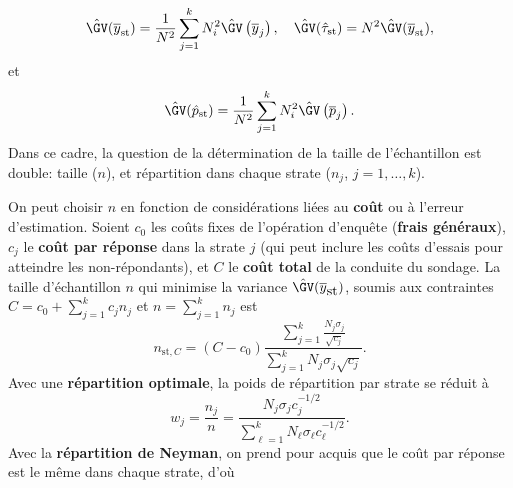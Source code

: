 $$\hat{\GV}(\overline{y}_{\textrm{st}})=\frac{1}{N^2}\sum_{j=1}^kN_i^2\hat{\GV}\left(\overline{y}_j\right),\quad \hat{\GV}(\hat{\tau}_{\textrm{st}})=N^2\hat{\GV}(\overline{y}_{\textrm{st}}),$$ et $$\hat{\GV}(\hat{p}_{\textrm{st}})=\frac{1}{N^2}\sum_{j=1}^kN_i^2\hat{\GV}\left(\overline{p}_j\right).$$ Dans ce cadre, la question de la détermination de la taille de l'échantillon est double: taille ($n$), et répartition dans chaque strate ($n_j$, $j=1,\ldots,k$). \par On peut choisir $n$ en fonction de considérations li\'ees au \textbf{coût} ou \`a l'erreur d'estimation. Soient $c_0$ les coûts fixes de l'opération d'enquête (\textbf{frais généraux}), $c_j$ le \textbf{coût par réponse} dans la strate $j$ (qui peut inclure les coûts d'essais pour atteindre les non-répondants), et $C$ le \textbf{coût total} de la conduite du sondage. La taille d'échantillon $n$ qui minimise la variance  $\hat{\GV}(\overline{y}_{\mbox{st}})$,  soumis aux contraintes $C=c_0+\sum_{j=1}^kc_jn_j$ et  $n=\sum_{j=1}^kn_j$ est  $$n_{\textrm{st},C}=(C-c_0)\frac{\sum_{j=1}^k \frac{N_j\sigma_j}{\sqrt{c_j}}}{\sum_{j=1}^k N_j\sigma_j\sqrt{c_j}}.$$ Avec une  \textbf{r\'epartition optimale}, la poids de r\'epartition par strate se r\'eduit \`a   $$w_j=\frac{n_j}{n}=\frac{N_j\sigma_jc_{j}^{-1/2}}{\sum_{\ell=1}^kN_{\ell}\sigma_{\ell}c_{\ell}^{-1/2}}.$$ 
Avec la \textbf{r\'epartition de Neyman}, on prend pour acquis que le co\^ut par r\'eponse est le m\^eme dans chaque strate, d'o\`u  
